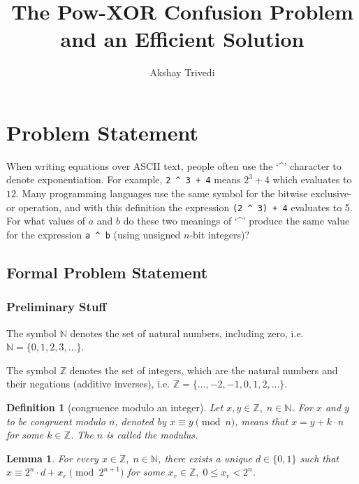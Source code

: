 \documentclass[1gpt]{article}
\title{The Pow-XOR Confusion Problem and an Efficient Solution}
\author{Akshay Trivedi}
\date{\vspace{-3em}}
\theoremstyle{break}
\newtheorem{lemma}[theorem]{Lemma}
\newtheorem{definition}[theorem]{Definition}
\begin{document}
\maketitle

\section{Problem Statement}

When writing equations over ASCII text, people often use the `\textasciicircum'
character to denote exponentiation. For example, \texttt{2 {\textasciicircum} 3
+ 4} means $2^3+4$ which evaluates to $12$. Many programming languages use the
same symbol for the bitwise exclusive-or operation, and with this definition
the expression \texttt{(2 {\textasciicircum} 3) + 4} evaluates to 5. For what
values of $a$ and $b$ do these two meanings of `\textasciicircum' produce the
same value for the expression \texttt{a {\textasciicircum} b} (using unsigned
$n$-bit integers)?

\subsection{Formal Problem Statement}

\subsubsection{Preliminary Stuff}

The symbol $\mathbb{N}$ denotes the set of natural numbers, including zero,
i.e. $\mathbb{N} = \{0, 1, 2, 3, \ldots\}$.

The symbol $\mathbb{Z}$ denotes the set of integers, which are the natural
numbers and their negations (additive inverses), i.e. $\mathbb{Z} = \{\ldots,
-2, -1, 0, 1, 2, \ldots\}$.

\begin{definition}[congruence modulo an integer]
    \label{def:mod}
    Let $x, y \in \mathbb{Z},\; n \in \mathbb{N}$. For $x$ and $y$ to be
    congruent modulo $n$, denoted by $x \equiv y \pmod{n}$, means that $x = y +
    k \cdot n$ for some $k \in \mathbb{Z}$. The $n$ is called the modulus.
\end{definition}

\begin{lemma}
    \label{lem:bit-of}
    For every $x \in \mathbb{Z},\; n \in \mathbb{N}$, there exists a unique $d
    \in \{ 0, 1 \}$ such that $x \equiv 2^n \cdot d + x_r \pmod{2^{n+1}}$ for
    some $x_r \in \mathbb{Z},\; 0 \leq x_r < 2^n$.
\end{lemma}
\end{document}
